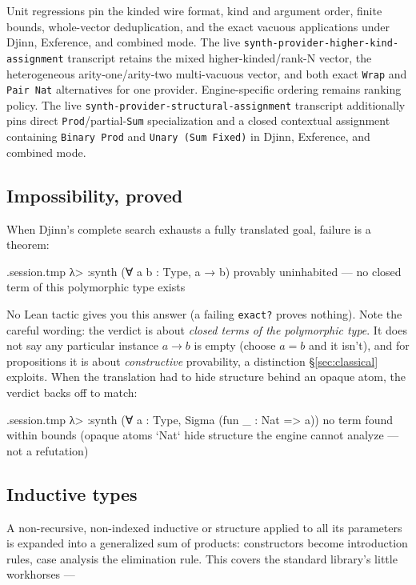 \documentclass[11pt,oneside]{article}
\newcommand{\code}[1]{\texttt{#1}}
\newenvironment{session}
 {\VerbatimEnvironment\begin{VerbatimOut}{\jobname.session.tmp}}
 {\end{VerbatimOut}%
  \begin{sessionouter}%
  \VerbatimInput[fontsize=\footnotesize, breaklines=true,
    breaksymbolleft={\textcolor{stone}{\footnotesize$\hookrightarrow$}},
    formatcom=\color{ink}, tabsize=4]{\jobname.session.tmp}%
  \end{sessionouter}}
\begin{document}
Unit regressions pin the kinded wire format, kind and argument order, finite
bounds, whole-vector deduplication, and the exact vacuous applications under
Djinn, Exference, and combined mode. The live
\code{synth-provider-higher-kind-assignment} transcript retains the mixed
higher-kinded/rank-N vector, the heterogeneous arity-one/arity-two
multi-vacuous vector, and both exact \code{Wrap} and \code{Pair Nat}
alternatives for one provider. Engine-specific ordering remains ranking policy.
The live \code{synth-provider-structural-assignment} transcript additionally
pins direct \code{Prod}/partial-\code{Sum} specialization and a closed contextual
assignment containing \code{Binary Prod} and \code{Unary (Sum Fixed)} in Djinn,
Exference, and combined mode.

\subsection{Impossibility, proved}\label{sec:negative}

When Djinn's complete search exhausts a fully translated goal, failure
is a theorem:

\begin{session}
λ> :synth (∀ a b : Type, a → b)
provably uninhabited — no closed term of this polymorphic type exists
\end{session}

No Lean tactic gives you this answer (a failing \code{exact?} proves
nothing). Note the careful wording: the verdict is about \emph{closed
terms of the polymorphic type}. It does not say any particular
instance $a \to b$ is empty (choose $a = b$ and it isn't), and
for propositions it is about \emph{constructive} provability, a
distinction \S\ref{sec:classical} exploits. When the translation had
to hide structure behind an opaque atom, the verdict backs off to
match:

\begin{session}
λ> :synth (∀ a : Type, Sigma (fun _ : Nat => a))
no term found within bounds (opaque atoms `Nat` hide structure the engine cannot analyze — not a refutation)
\end{session}

\subsection{Inductive types}\label{sec:inductives}

A non-recursive, non-indexed inductive or structure applied to all its
parameters is expanded into a generalized sum of products:
constructors become introduction rules, case analysis the elimination
rule. This covers the standard library's little workhorses ---
\end{document}

